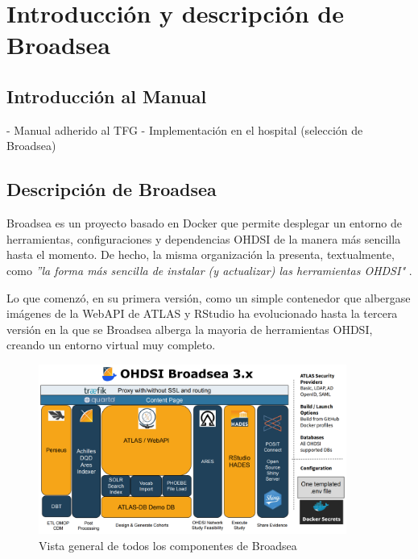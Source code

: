 \chapter{Introducción y descripción de Broadsea} \label{cap:Introduccion}


\section{Introducción al Manual} \label{cap:Introduccion al manual}

- Manual adherido al TFG
- Implementación en el hospital (selección de Broadsea)

\section{Descripción de Broadsea}

Broadsea es un proyecto basado en Docker que permite desplegar un entorno de herramientas, configuraciones y dependencias OHDSI de la manera más sencilla hasta el momento. De hecho, la misma organización la presenta, textualmente, como \textit{''la forma más sencilla de instalar (y actualizar) las herramientas OHDSI"} \cite{Broadsea3PDF}.

Lo que comenzó, en su primera versión, como un simple contenedor que albergase imágenes de la WebAPI de ATLAS y RStudio ha evolucionado hasta la tercera versión en la que se Broadsea alberga la mayoria de herramientas OHDSI, creando un entorno virtual muy completo.

\begin{figure}[H]
    \centering
    \includegraphics[width=0.90\textwidth]{figures/OHDSIBroadsea3.0.png}
    \caption{Vista general de todos los componentes de Broadsea \cite{Broadsea3PPTX}}
    \label{fig:enter-label}
\end{figure}

